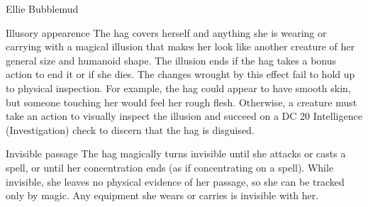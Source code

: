 \documentclass[10pt,twoside, twocolumn, openany]{dndbook}
\begin{document}
\begin{DndMonster}{Ellie Bubblemud}

  \DndMonsterMelee[
    name=Claws,
    mod=+6,
    reach=5,
    targets=one target,
    dmg=\DndDice{2d8+4},
    dmg-type = Slashing,
  ]

  \begin{DndMonsterAction}{Illusory appearence}
    The hag covers herself and anything she is
wearing or carrying with a magical illusion that makes her look
like another creature of her general size and humanoid shape.
The illusion ends if the hag takes a bonus action to end it or
if she dies.
The changes wrought by this effect fail to hold up to physical
inspection. For example, the hag could appear to have smooth
skin, but someone touching her would feel her rough flesh.
Otherwise, a creature must take an action to visually inspect
the illusion and succeed on a DC 20 Intelligence (Investigation)
check to discern that the hag is disguised.
  \end{DndMonsterAction}

  \begin{DndMonsterAction}{Invisible passage}
    The hag magically turns invisible until she
    attacks or casts a spell, or until her concentration ends (as
    if concentrating on a spell). While invisible, she leaves no
    physical evidence of her passage, so she can be tracked only by
    magic. Any equipment she wears or carries is invisible with her.  
  \end{DndMonsterAction}

\end{DndMonster}%
\end{document}
